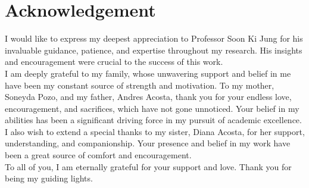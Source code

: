 \section*{Acknowledgement} 						%

\textmd{I would like to express my deepest appreciation to Professor Soon Ki Jung for his invaluable guidance, patience, and expertise throughout my research. His insights and encouragement were crucial to the success of this work.\\I am deeply grateful to my family, whose unwavering support and belief in me have been my constant source of strength and motivation. To my mother, Soneyda Pozo, and my father, Andres Acosta, thank you for your endless love, encouragement, and sacrifices, which have not gone unnoticed. Your belief in my abilities has been a significant driving force in my pursuit of academic excellence.\\I also wish to extend a special thanks to my sister, Diana Acosta, for her support, understanding, and companionship. Your presence and belief in my work have been a great source of comfort and encouragement.\\To all of you, I am eternally grateful for your support and love. Thank you for being my guiding lights.}